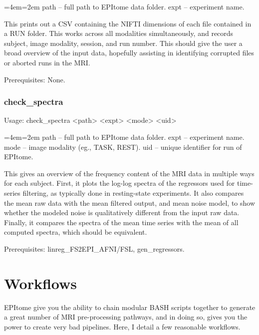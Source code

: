 \documentclass[final,titlepage,letterpaper,oneside,12pt]{article}
\renewcommand{\texttt}[2][BrickRed]{\textcolor{#1}{\ttfamily #2}}%
\newenvironment{blockquote}{%
  \par%
  \medskip
  \leftskip=4em\rightskip=2em%
  \noindent\ignorespaces}{%
  \par\medskip}
\begin{document}
\begin{blockquote}
path -- full path to EPItome data folder.
expt -- experiment name.
\end{blockquote}

\noindent This prints out a CSV containing the NIFTI dimensions of each file contained in a RUN folder. This works across all modalities simultaneously, and records subject, image modality, session, and run number. This should give the user a broad overview of the input data, hopefully assisting in identifying corrupted files or aborted runs in the MRI.

Prerequisites: None.

\subsubsection{check\_spectra}
Usage: \texttt{check\_spectra <path> <expt> <mode> <uid>}

\begin{blockquote}
path -- full path to EPItome data folder.
expt -- experiment name.
mode -- image modality (eg., TASK, REST).
uid -- unique identifier for run of EPItome.
\end{blockquote}

\noindent This gives an overview of the frequency content of the MRI data in multiple ways for each subject. First, it plots the log-log spectra of the regressors used for time-series filtering, as typically done in resting-state experiments. It also compares the mean raw data with the mean filtered output, and mean noise model, to show whether the modeled noise is qualitatively different from the input raw data. Finally, it compares the spectra of the mean time series with the mean of all computed spectra, which should be equivalent.

Prerequisites: \texttt{linreg\_FS2EPI\_AFNI/FSL, gen\_regressors}.

\section{Workflows}

EPItome give you the ability to chain modular BASH scripts together to generate a great number of MRI pre-processing pathways, and in doing so, gives you the power to create very bad pipelines. Here, I detail a few reasonable workflows.
\end{document}
